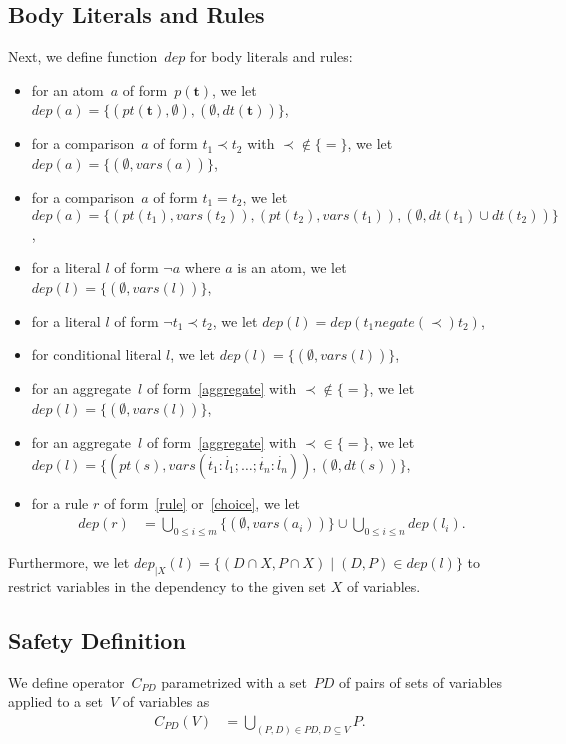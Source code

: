 \documentclass{article}
\newcommand{\pool}[1]{\boldsymbol{#1}}
\newcommand{\tuple}[1]{\dot{#1}}
\newcommand{\set}[1]{\{#1\}}
\newcommand\Vars{\mathit{vars}}
\newcommand\Negate{\mathit{negate}}
\newcommand\Provide{\mathit{pt}}
\newcommand\Depend{\mathit{dt}}
\newcommand\ProDep{\mathit{dep}}
\newcommand\PD{\mathit{P\!D}}
\newcommand\CheckOp[1]{C_{#1}}
\begin{document}
	\subsection{Body Literals and Rules}
	Next, we define function~$\ProDep$ for body literals and rules:
	\begin{itemize}
		\item 
			for an atom~$a$ of form~$p(\pool{t})$, we let
			$\ProDep(a) = \set{(\Provide(\pool{t}), \emptyset), (\emptyset, \Depend(\pool{t}))}$,
		\item
			for a comparison~$a$ of form $t_1 \prec t_2$ with ${\prec} \notin \set{{=}}$, we let
			$\ProDep(a) = \set{(\emptyset, \Vars(a))}$,
		\item
			for a comparison~$a$ of form $t_1 = t_2$, we let
			$\ProDep(a) = \set{(\Provide(t_1), \Vars(t_2)), (\Provide(t_2), \Vars(t_1)), (\emptyset, \Depend(t_1) \cup \Depend(t_2))}$,
		\item 
			for a literal $l$ of form $\neg a$ where $a$ is an atom, we let
			$\ProDep(l) = \set{(\emptyset, \Vars(l))}$,
		\item 
			for a literal $l$ of form $\neg t_1 \prec t_2$, we let
			$\ProDep(l) = \ProDep(t_1 \mathrel{\Negate({\prec})} t_2)$,
		\item
			for conditional literal $l$, we let
			$\ProDep(l) = \set{(\emptyset, \Vars(l))}$,
		\item
			for an aggregate~$l$ of form~\eqref{aggregate} with ${\prec} \notin \set{{=}}$, we let
			$\ProDep(l) = \set{(\emptyset, \Vars(l))}$,
		\item
			for an aggregate~$l$ of form~\eqref{aggregate} with ${\prec} \in \set{{=}}$, we let
			$\ProDep(l) = \set{(\Provide(s), \Vars(\tuple{t_1} : \tuple{l_1}; \dots; \tuple{t_n} : \tuple{l_n})), (\emptyset,\Depend(s))}$,
		\item
			for a rule $r$ of form~\eqref{rule} or~\eqref{choice}, we let
			\begin{align*}
				\ProDep(r) &= \bigcup_{0 \leq i \leq m} \set{(\emptyset, \Vars(a_i))} \cup \bigcup_{0 \leq i \leq n} \ProDep(l_i).
			\end{align*}
	\end{itemize}
	Furthermore, we let $\ProDep_{|X}(l) = \set{(D \cap X, P \cap X) \mid (D, P) \in \ProDep(l)}$
	to restrict variables in the dependency to the given set $X$ of variables.


	\subsection{Safety Definition}
	We define operator~$\CheckOp{\PD}$ parametrized with a set~$\PD$ of pairs of sets of variables
	applied to a set~$V$ of variables as
	\begin{align*}
	\CheckOp{\PD}(V) &= \bigcup_{(P,D) \in \PD, D \subseteq V} P.
	\end{align*}
\end{document}
